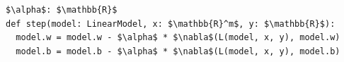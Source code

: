 \documentclass[border=10pt]{standalone}
\begin{document}
\begin{lstlisting}
$\alpha$: $\mathbb{R}$
def step(model: LinearModel, x: $\mathbb{R}^m$, y: $\mathbb{R}$):
  model.w = model.w - $\alpha$ * $\nabla$(L(model, x, y), model.w)
  model.b = model.b - $\alpha$ * $\nabla$(L(model, x, y), model.b)
\end{lstlisting}
\end{document}
